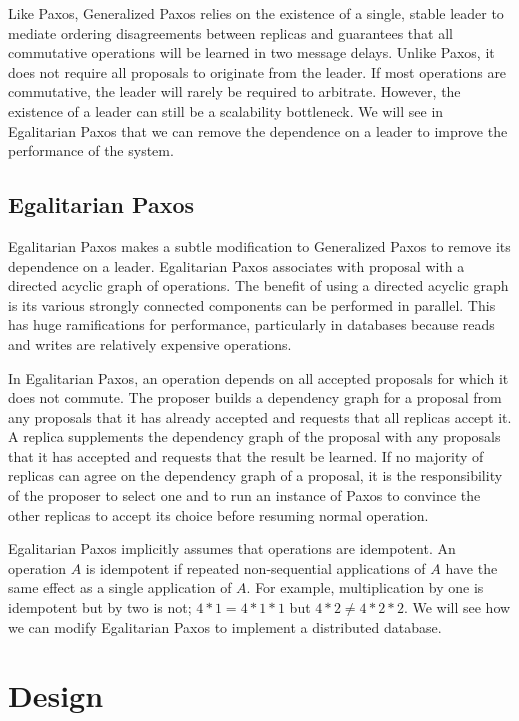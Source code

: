 \documentclass[../main.tex]{subfiles}
\begin{document}
  Like Paxos, Generalized Paxos relies on the existence of a single, stable leader to mediate
  ordering disagreements between replicas and guarantees that all commutative operations will be
  learned in two message delays. Unlike Paxos, it does not require all proposals to originate from
  the leader. If most operations are commutative, the leader will rarely be required to arbitrate.
  However, the existence of a leader can still be a scalability bottleneck. We will see in
  Egalitarian Paxos that we can remove the dependence on a leader to improve the performance of the
  system.

  \subsection{Egalitarian Paxos}
  Egalitarian Paxos makes a subtle modification to Generalized Paxos to remove its dependence on a
  leader. Egalitarian Paxos associates with proposal with a directed acyclic graph of operations.
  The benefit of using a directed acyclic graph is its various strongly connected components can be
  performed in parallel. This has huge ramifications for performance, particularly in databases
  because reads and writes are relatively expensive operations. \cite{epaxos}

  In Egalitarian Paxos, an operation depends on all accepted proposals for which it does not
  commute. The proposer builds a dependency graph for a proposal from any proposals that it has
  already accepted and requests that all replicas accept it. A replica supplements the dependency
  graph of the proposal with any proposals that it has accepted and requests that the result be
  learned. If no majority of replicas can agree on the dependency graph of a proposal, it is the
  responsibility of the proposer to select one and to run an instance of Paxos to convince the
  other replicas to accept its choice before resuming normal operation.

  Egalitarian Paxos implicitly assumes that operations are idempotent. An operation $A$ is
  idempotent if repeated non-sequential applications of $A$ have the same effect as a single
  application of $A$. For example, multiplication by one is idempotent but by two is not;
  $4 * 1 = 4 * 1 * 1$ but $4 * 2 \ne 4 * 2 * 2$. We will see how we can modify Egalitarian Paxos to
  implement a distributed database.

\section{Design}
\end{document}
